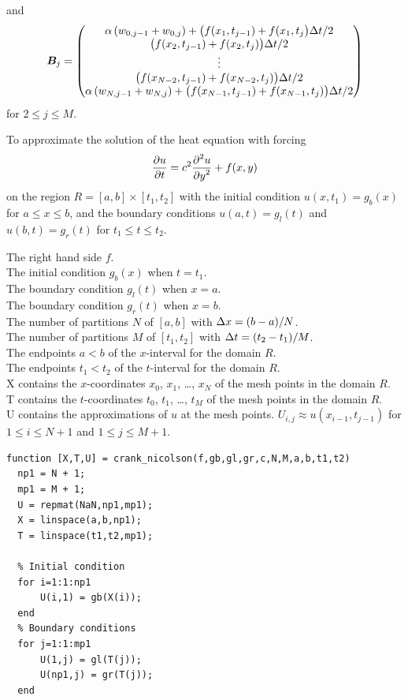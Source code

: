 and
\[
\bm{B}_j = \begin{pmatrix}
\alpha \left( w_{0,j-1} + w_{0,j} \right)
+ \big( f(x_1,t_{j-1}) +f(x_1,t_j\big) \Delta{t}/2 \\
\big( f(x_2,t_{j-1}) +f(x_2,t_j)\big) \Delta{t}/2 \\
\vdots \\
\big( f(x_{N-2},t_{j-1}) +f(x_{N-2},t_j)\big) \Delta{t}/2 \\
\alpha \left( w_{N,j-1} + w_{N,j} \right)
+ \big( f(x_{N-1},t_{j-1})+f(x_{N-1},t_j)\big) \Delta{t}/2
\end{pmatrix}
\]
for $2 \leq j \leq M$.

\begin{code}
To approximate the solution of the heat equation with forcing
\[
  \frac{\partial{u}}{\partial{t}} = c^2 \frac{\displaystyle \partial^{2}{u}} {\displaystyle \partial{y}^{2}} + f(x,y)
\]
on the region $R = [a,b]\times[t_1,t_2]$ with the initial condition
$u(x,t_1) = g_b(x)$ for $a \leq x \leq b$, and the boundary conditions
$u(a,t) = g_l(t)$ and $u(b,t) = g_r(t)$ for $t_1 \leq t \leq t_2$.

 The right hand side $f$.\\
The initial condition $g_b(x)$ when $t = t_1$.\\
The boundary condition $g_l(t)$ when $x = a$.\\
The boundary condition $g_r(t)$ when $x = b$.\\
The number of partitions $N$ of $[a,b]$ with $\Delta{x} = (b-a)/N$.\\
The number of partitions $M$ of $[t_1,t_2]$ with $\Delta{t} = (t_2-t_1)/M$.  \\
The endpoints $a < b$ of the $x$-interval for the domain $R$.\\
The endpoints $t_1 < t_2$ of the $t$-interval for the domain $R$.\\
X contains the $x$-coordinates $x_0$, $x_1$, \ldots, $x_N$ of the
mesh points in the domain $R$.\\
T contains the $t$-coordinates $t_0$, $t_1$, \ldots, $t_M$ of the
mesh points in the domain $R$.\\
U contains the approximations of $u$ at the mesh points.
$U_{i,j} \approx u(x_{i-1},t_{j-1})$ for $1\leq i \leq N+1$ and
$1 \leq j \leq M+1$.
\small
\begin{verbatim}
function [X,T,U] = crank_nicolson(f,gb,gl,gr,c,N,M,a,b,t1,t2)
  np1 = N + 1;
  mp1 = M + 1;
  U = repmat(NaN,np1,mp1);
  X = linspace(a,b,np1);
  T = linspace(t1,t2,mp1);

  % Initial condition
  for i=1:1:np1
      U(i,1) = gb(X(i));
  end
  % Boundary conditions
  for j=1:1:mp1
      U(1,j) = gl(T(j));
      U(np1,j) = gr(T(j));
  end


\end{verbatim}
\end{code}
